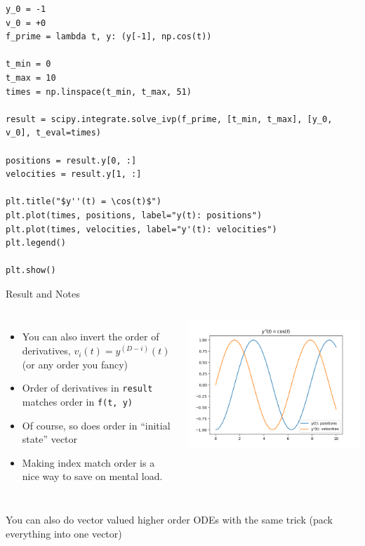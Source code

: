 \begin{frame}[fragile]
%
\begin{codebox}[Second Order ODE: $y'' {=} \cos(t)$]
\begin{verbatim}
y_0 = -1
v_0 = +0
f_prime = lambda t, y: (y[-1], np.cos(t))

t_min = 0
t_max = 10
times = np.linspace(t_min, t_max, 51)

result = scipy.integrate.solve_ivp(f_prime, [t_min, t_max], [y_0, v_0], t_eval=times)

positions = result.y[0, :]
velocities = result.y[1, :]

plt.title("$y''(t) = \cos(t)$")
plt.plot(times, positions, label="y(t): positions")
plt.plot(times, velocities, label="y'(t): velocities")
plt.legend()

plt.show()
\end{verbatim}
\end{codebox}
%
\end{frame}


\begin{frame}{Result and Notes}
%
\begin{columns}
\begin{itemize}
\item You can also invert the order of derivatives, \ie $v_i(t) = y^{(D-i)}(t)$ (or any order you fancy)
\item Order of derivatives in \texttt{result} matches order in \texttt{f(t, y)}
\item Of course, so does order in \enquote{initial state} vector
\item Making index match order is a nice way to save on mental load.
\end{itemize}
%
\includegraphics[width=\linewidth]{./gfx/04-ODE-second-degree}
\end{columns}
%
\begin{hintbox}
\footnotesize
You can also do vector valued higher order ODEs with the same trick (pack everything into one vector)
\end{hintbox}
%
\end{frame}

